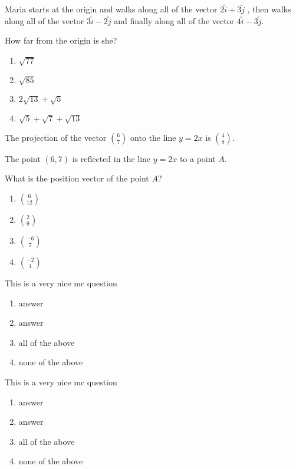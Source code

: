 \begin{multiplechoice}
    \pagebreak
    
    \item Maria starts at the origin and walks along all of the vector $2\utilde{i}+3\utilde{j}$ , then walks along all of the vector $3\utilde{i}-2\utilde{j}$ and finally along all of the vector $4\utilde{i}-3\utilde{j}$.

    How far from the origin is she? %
    \begin{enumerate}               %
        \item $\sqrt{77}$           %
        \item $\sqrt{85}$
        \item $2\sqrt{13}+\sqrt{5}$
        \item $\sqrt{5}+\sqrt{7}+\sqrt{13}$
    \end{enumerate}  
    
    \item The projection of the vector $\displaystyle\binom{6}{7}$ onto the line $y=2x$ is $\displaystyle\binom{4}{8}$.
    
    The point $(6,7)$ is reflected in the line $y=2x$ to a point $A$. 
    
    What is the position vector of the point $A$? 
    \begin{enumerate}   
        \item $\displaystyle\binom{6}{12}$ 
        \item $\displaystyle\binom{2}{9}$
        \item $\displaystyle\binom{-6}{7}$
        \item $\displaystyle\binom{-2}{1}$
    \end{enumerate}

    \item This is a very nice mc question
    \begin{enumerate}   
        \item answer  
        \item answer
        \item all of the above
        \item none of the above
    \end{enumerate}

    \item This is a very nice mc question
    \begin{enumerate}   
        \item answer  
        \item answer
        \item all of the above
        \item none of the above
    \end{enumerate}


\end{multiplechoice}
